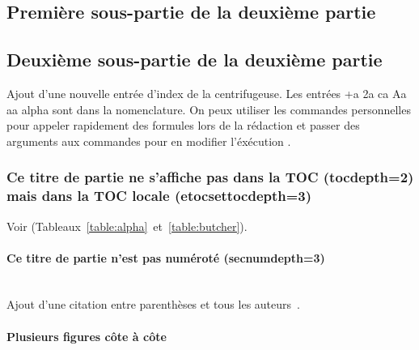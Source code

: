 	\lipsum[3]

	\subsection{Première sous-partie de la deuxième partie}

		\lipsum[4]

	\subsection[Sous-partie 2]{Deuxième sous-partie de la deuxième partie} %

		Ajout d'une nouvelle entrée d'index de la centrifugeuse. Les entrées \gls{+a} \gls{2a} \gls{ca} \gls{Aa} \gls{aa} \gls{alpha} {\NoAutoSpaceBeforeFDP}sont dans la nomenclature. On peux utiliser les commandes personnelles pour appeler rapidement des formules lors de la rédaction \acc et passer des arguments aux commandes pour en modifier l'éxécution \emiss[\nu]{\Omega}.

		\subsubsection{Ce titre de partie ne s'affiche pas dans la TOC (tocdepth=2) mais dans la TOC locale (etocsettocdepth=3)}

			Voir (Tableaux~\ref{table:alpha}~et~\ref{table:butcher}).

			\paragraph{Ce titre de partie n'est pas numéroté (secnumdepth=3)}~~\\ %

				Ajout d'une citation entre parenthèses et tous les auteurs~\parencite{zohdy_mapping_2012}.

			\paragraph{Plusieurs figures côte à côte}~~\\

				\lipsum[66]


